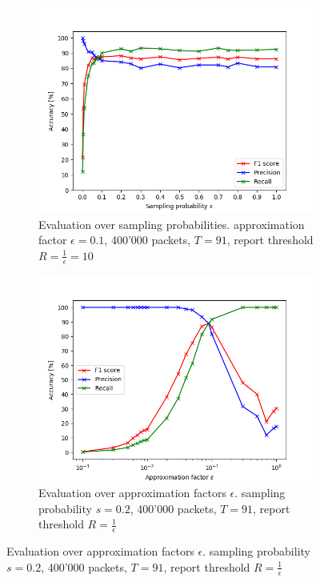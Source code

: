 \documentclass[11pt,oneside,a4paper]{article}
\begin{document}
\begin{figure}
	\centering
	\begin{subfigure}{.5\textwidth}
		\centering
		\includegraphics[width=\linewidth]{figures/sampl_prob_400k_e0_1_re}
		\caption{Evaluation over sampling probabilities. \newline
			approximation factor $\epsilon = 0.1$, 400'000 packets, \newline
			 $T = 91$, report threshold $R = \frac{1}{\epsilon} = 10$}
		\label{fig:sampling_prob_graph}
	\end{subfigure}%
	\begin{subfigure}{.5\textwidth}
		\centering
		\includegraphics[width=\linewidth]{figures/epsilon_400k_s0_2_re}
		\caption{Evaluation over approximation factors $\epsilon$. \newline
			sampling probability $s = 0.2$, 400'000 packets, \newline
			$T = 91$, report threshold $R = \frac{1}{\epsilon}$}
		\label{fig:epsilon_graph}
	\end{subfigure}
\end{figure}
\end{document}
